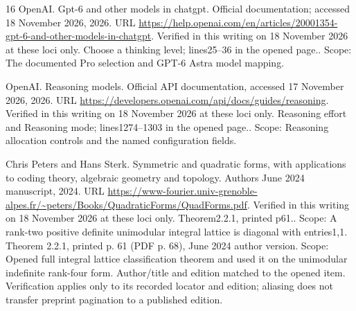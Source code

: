 \documentclass[11pt,a4paper]{article}
\theoremstyle{definition}
\begin{document}
\begin{thebibliography}{16}
{OpenAI}.
\newblock Gpt-6 and other models in chatgpt.
\newblock Official documentation;\allowbreak{} accessed 18 November 2026,
  2026{}.
\newblock URL
  \url{https://help.openai.com/en/articles/20001354-gpt-6-and-other-models-in-chatgpt}.
\newblock Verified in this writing on 18 November 2026 at these loci only.
  Choose a thinking level;\allowbreak{} lines25–36 in the opened page.. Scope: The
  documented Pro selection and GPT-6 Astra model mapping.

{OpenAI}.
\newblock Reasoning models.
\newblock Official API documentation, accessed 17 November 2026,
  2026{}.
\newblock URL \url{https://developers.openai.com/api/docs/guides/reasoning}.
\newblock Verified in this writing on 18 November 2026 at these loci only.
  Reasoning effort and Reasoning mode;\allowbreak{} lines1274–1303 in the opened page..
  Scope: Reasoning allocation controls and the named configuration fields.

Chris Peters and Hans Sterk.
\newblock Symmetric and quadratic forms, with applications to coding theory,
  algebraic geometry and topology.
\newblock Authors\textquotesingle{} June 2024 manuscript, 2024.
\newblock URL
  \url{https://www-fourier.univ-grenoble-alpes.fr/~peters/Books/QuadraticForms/QuadForms.pdf}.
\newblock Verified in this writing on 18 November 2026 at these loci only.
  Theorem2.2.1, printed p61.. Scope: A rank-two positive definite unimodular
  integral lattice is diagonal with entries1,1. Theorem 2.2.1, printed p. 61
  (PDF p. 68), June 2024 author version. Scope: Opened full integral lattice
  classification theorem and used it on the unimodular indefinite rank-four
  form. Author/title and edition matched to the opened item. Verification
  applies only to its recorded locator and edition;\allowbreak{} aliasing does not transfer
  preprint pagination to a published edition.


\end{thebibliography}
\end{document}
